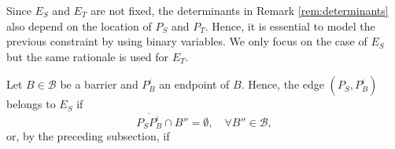 \documentclass[a4paper]{elsarticle}
\newcommand{\B}{{\mathcal B}}
\newcommand{\ES}{{E^{}_{S}}}
\newcommand{\ET}{{E^{}_{T}}}
\begin{document}


%







Since $\ES$ and $\ET$ are not fixed, the determinants in Remark \ref{rem:determinants} also depend on the location of $P_S$ and $P^{}_T$.  Hence, it is essential to model the previous constraint by using binary variables. We only focus on the case of $E_S$ but the same rationale is used for $E_T$.

Let $B\in\B$ be a barrier and $P_B^i$ an endpoint of $B$. Hence, the edge $(P^{}_S, P_B^i)$ belongs to $\ES$ if
$$\overline{P^{}_SP^i_B}\cap B''=\emptyset,\quad \forall B''\in\B,$$
or,
by the preceding subsection, if

\end{document}
